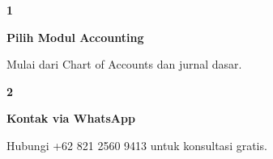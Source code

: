 \documentclass[a4paper]{article}
\begin{document}
\begin{center}
\begin{minipage}[t]{0.318\textwidth}
    \colorbox{BlueBg}{%
        \begin{minipage}{\dimexpr\linewidth-2\fboxsep\relax}
            \vspace{6pt}
            \begin{center}
                {\fontsize{22}{26}\selectfont\bfseries\color{BluePrimary} 1}
            \end{center}
            \vspace{2pt}
            \begin{center}
                {\fontsize{10}{13}\selectfont\bfseries\color{BlueDark} Pilih Modul Accounting}\par\vspace{3pt}
                {\fontsize{9}{12}\selectfont\color{TextDark} Mulai dari Chart of Accounts dan jurnal dasar.}
            \end{center}
            \vspace{6pt}
        \end{minipage}}
\end{minipage}%
\hfill
\begin{minipage}[t]{0.318\textwidth}
    \colorbox{BlueBg}{%
        \begin{minipage}{\dimexpr\linewidth-2\fboxsep\relax}
            \vspace{6pt}
            \begin{center}
                {\fontsize{22}{26}\selectfont\bfseries\color{BluePrimary} 2}
            \end{center}
            \vspace{2pt}
            \begin{center}
                {\fontsize{10}{13}\selectfont\bfseries\color{BlueDark} Kontak via WhatsApp}\par\vspace{3pt}
                {\fontsize{9}{12}\selectfont\color{TextDark} Hubungi +62 821 2560 9413 untuk konsultasi gratis.}
            \end{center}
            \vspace{6pt}
        \end{minipage}}
\end{minipage}%
\hfill
\begin{minipage}[t]{0.318\textwidth}
    \colorbox{BlueBg}{%
        \begin{minipage}{\dimexpr\linewidth-2\fboxsep\relax}
            \vspace{6pt}

\end{minipage}}
\end{minipage}
\end{center}
\end{document}
